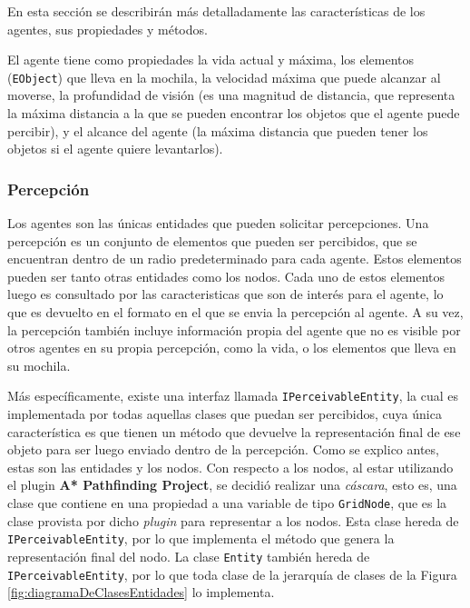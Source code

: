 \documentclass[a4paper,oneside]{article}
\begin{document}
\label{sec:agentes}

En esta sección se describirán más detalladamente las características de los agentes, 
sus propiedades y métodos.

El agente tiene como propiedades la vida actual y máxima, los elementos 
(\texttt{EObject}) que lleva en la mochila, la velocidad máxima que puede alcanzar al
moverse, la profundidad de visión (es una magnitud de distancia, que representa la máxima 
distancia a la que se pueden encontrar los objetos que el agente puede percibir), y el
alcance del agente (la máxima distancia que pueden tener los objetos si el agente quiere
levantarlos).

\subsubsection{Percepción}

Los agentes son las únicas entidades que pueden solicitar percepciones. Una percepción
es un conjunto de elementos que pueden ser percibidos, que se encuentran dentro de un
radio predeterminado para cada agente. Estos elementos pueden ser tanto otras entidades
como los nodos. Cada uno de estos elementos luego es consultado por las caracteristicas
que son de interés para el agente, lo que es devuelto en el formato en el que se envia
la percepción al agente. A su vez, la percepción también incluye información propia del
agente que no es visible por otros agentes en su propia percepción, como la vida, o los
elementos que lleva en su mochila.

Más específicamente, existe una interfaz llamada \texttt{IPerceivableEntity}, la cual es
implementada por todas aquellas clases que puedan ser percibidos, cuya única 
característica es que tienen un método que devuelve la representación final de ese 
objeto para ser luego enviado dentro de la percepción. Como se explico antes,
estas son las entidades y los nodos. Con respecto a los nodos, al estar utilizando el 
plugin \textbf{A* Pathfinding Project}, se decidió realizar una \textit{cáscara}, esto 
es, una clase que contiene en una propiedad a una variable de tipo \texttt{GridNode},
que es la clase provista por dicho \textit{plugin} para representar a los nodos. Esta 
clase hereda de \texttt{IPerceivableEntity}, por lo que implementa el método que genera
la representación final del nodo. La clase \texttt{Entity} también hereda de 
\texttt{IPerceivableEntity}, por lo que toda clase de 
la jerarquía de clases de la Figura \ref{fig:diagramaDeClasesEntidades} lo implementa.
\end{document}

